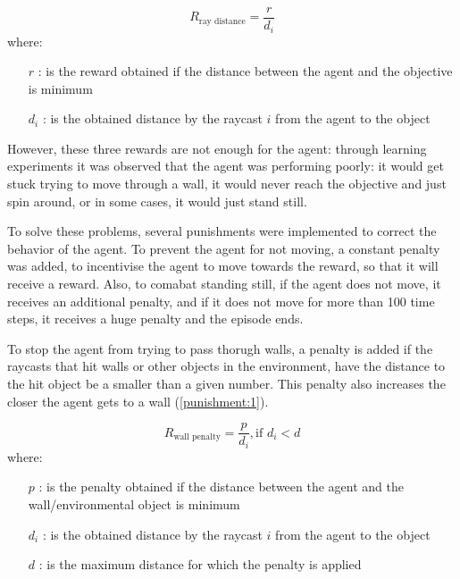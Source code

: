 \begin{equation} \label{reward:2}
    R_\text{ray distance} = \frac{r}{d_{i}}
\end{equation}
where:
\begin{itemize}
    \item [$r$]: is the reward obtained if the distance between the agent and the objective is minimum
    \item [$d_{i}$]: is the obtained distance by the raycast $i$ from the agent to the object
\end{itemize}

However, these three rewards are not enough for the agent: through learning experiments it was observed that the agent was performing poorly: it would get stuck trying to move through a wall, it would never reach the objective and just spin around, or in some cases, it would just stand still.

To solve these problems, several punishments were implemented to correct the behavior of the agent. To prevent the agent for not moving, a constant penalty was added, to incentivise the agent to move towards the reward, so that it will receive a reward. Also, to comabat standing still, if the agent does not move, it receives an additional penalty, and if it does not move for more than 100 time steps, it receives a huge penalty and the episode ends. 

To stop the agent from trying to pass thorugh walls, a penalty is added if the raycasts that hit walls or other objects in the environment, have the distance to the hit object be a smaller than a given number. This penalty also increases the closer the agent gets to a wall (\ref{punishment:1}). 

\begin{equation} \label{punishment:1}
    R_\text{wall penalty} = \frac{p}{d_{i}}, \text{if } d_{i} < d
\end{equation}
where:
\begin{itemize}
    \item [$p$]: is the penalty obtained if the distance between the agent and the wall/environmental object is minimum
    \item [$d_{i}$]: is the obtained distance by the raycast $i$ from the agent to the object
    \item [$d$]: is the maximum distance for which the penalty is applied
\end{itemize}

